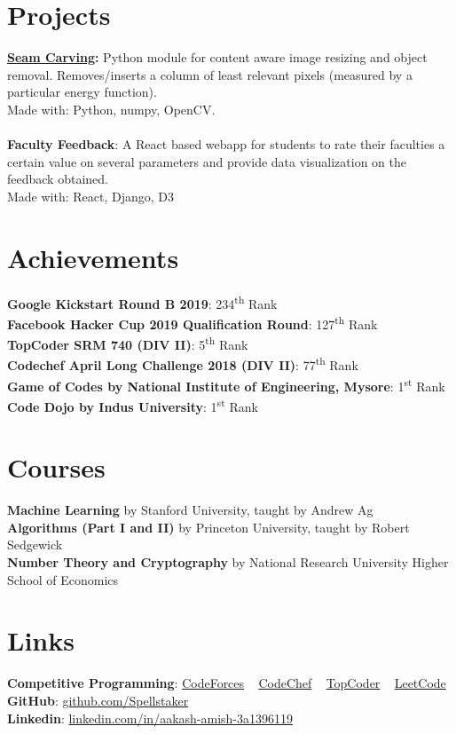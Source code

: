 \documentclass[margin, centered]{res}
\begin{document}
\begin{resume}
		\section{Projects}
			\textbf{\href{https://github.com/Spellstaker/Seam-Carving}{Seam Carving}:}
			Python module for content aware image resizing and object removal.
			Removes/inserts a column of least relevant pixels (measured by a particular energy function).\\
			Made with: Python, numpy, OpenCV.
			\\ \\
			\textbf{Faculty Feedback}:
			A React based webapp for students to rate their faculties a certain value on several parameters
			and provide data visualization on the feedback obtained.\\
			Made with: React, Django, D3
		
		\section{Achievements}
			\textbf{Google Kickstart Round B 2019}: 234\textsuperscript{th} Rank\\
			\textbf{Facebook Hacker Cup 2019 Qualification Round}: 127\textsuperscript{th} Rank\\
			\textbf{TopCoder SRM 740 (DIV II)}: 5\textsuperscript{th} Rank\\
			\textbf{Codechef April Long Challenge 2018 (DIV II)}: 77\textsuperscript{th} Rank\\
			\textbf{Game of Codes by National Institute of Engineering, Mysore}: 1\textsuperscript{st} Rank\\
			\textbf{Code Dojo by Indus University}: 1\textsuperscript{st} Rank
		
		\section{Courses}
			\textbf{Machine Learning} by Stanford University, taught by Andrew Ag\\
			\textbf{Algorithms (Part I and II)} by Princeton University, taught by Robert Sedgewick\\
			\textbf{Number Theory and Cryptography} by National Research University Higher School of Economics 
		
		\section{Links}
			\textbf{Competitive Programming}:
			\href{https://codeforces.com/profile/spellstaker}{CodeForces}
			~
			\href{https://www.codechef.com/users/spellstaker}{CodeChef}
			~
			\href{https://topcoder.com/members/spellstaker/}{TopCoder}
			~
			\href{https://leetcode.com/spellstaker/}{LeetCode}
			\\
			\textbf{GitHub}: \href{https://github.com/Spellstaker}{github.com/Spellstaker}
			\\
			\textbf{Linkedin}: \href{https://www.linkedin.com/in/aakash-amish-3a1396119/}{linkedin.com/in/aakash-amish-3a1396119}
	\end{resume}
\end{document}
